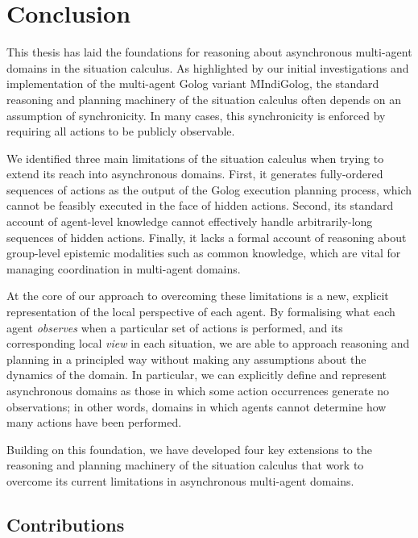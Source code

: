 

\chapter{Conclusion}

\label{ch:conclusion}

This thesis has laid the foundations for reasoning about asynchronous
multi-agent domains in the situation calculus. As highlighted by our
initial investigations and implementation of the multi-agent Golog
variant MIndiGolog, the standard reasoning and planning machinery
of the situation calculus often depends on an assumption of synchronicity.
In many cases, this synchronicity is enforced by requiring all actions
to be publicly observable.

We identified three main limitations of the situation calculus when
trying to extend its reach into asynchronous domains. First, it generates
fully-ordered sequences of actions as the output of the Golog execution
planning process, which cannot be feasibly executed in the face of
hidden actions. Second, its standard account of agent-level knowledge
cannot effectively handle arbitrarily-long sequences of hidden actions.
Finally, it lacks a formal account of reasoning about group-level
epistemic modalities such as common knowledge, which are vital for
managing coordination in multi-agent domains.

At the core of our approach to overcoming these limitations is a new,
explicit representation of the local perspective of each agent. By
formalising what each agent \emph{observes} when a particular set
of actions is performed, and its corresponding local \emph{view} in
each situation, we are able to approach reasoning and planning in
a principled way without making any assumptions about the dynamics
of the domain. In particular, we can explicitly define and represent
asynchronous domains as those in which some action occurrences generate
no observations; in other words, domains in which agents cannot determine
how many actions have been performed.

Building on this foundation, we have developed four key extensions
to the reasoning and planning machinery of the situation calculus
that work to overcome its current limitations in asynchronous multi-agent
domains.


\section{Contributions}

